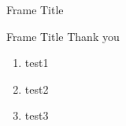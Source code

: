 \documentclass{beamer}
\begin{document}

\begin{frame}{Frame Title}
    
\end{frame}

\begin{frame}{Frame Title}
Thank you
\begin{enumerate}[Step 1:]
    \item test1
    \item test2
    \item test3

\end{enumerate}

    
\end{frame}
\end{document}
